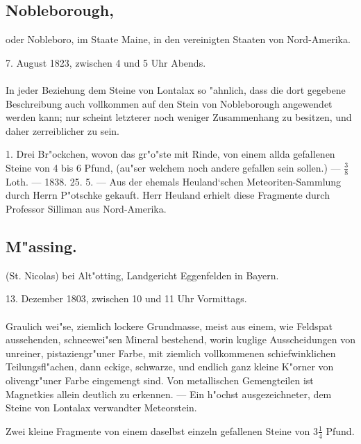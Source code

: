 \documentclass[a4paper, 11pt, oneside, polutonikogreek, german]{article}
\begin{document}
\subsection[Nobleborough.]{Nobleborough,}
\begin{center}
\small
oder Nobleboro, im Staate Maine, in den vereinigten Staaten von Nord-Amerika.

7. August 1823, zwischen 4 und 5 Uhr Abends.
\end{center}
\paragraph{}
In jeder Beziehung dem Steine von Lontalax so "ahnlich, dass die dort gegebene Beschreibung auch vollkommen auf den Stein von Nobleborough angewendet werden kann; nur scheint letzterer noch weniger Zusammenhang zu besitzen, und daher zerreiblicher zu sein.

1. Drei Br"ockchen, wovon das gr"o"ste mit Rinde, von einem allda gefallenen Steine von 4 bis 6 Pfund, (au"ser welchem noch andere gefallen sein sollen.) --- $\frac{3}{8}$ Loth. --- 1838. 25. 5. --- Aus der ehemals Heuland‘schen Meteoriten-Sammlung durch Herrn P"otschke gekauft. Herr Heuland erhielt diese Fragmente durch Professor Silliman aus Nord-Amerika.
\subsection{M"assing.}
\begin{center}
\small
(St. Nicolas) bei Alt"otting, Landgericht Eggenfelden in Bayern.

13. Dezember 1803, zwischen 10 und 11 Uhr Vormittags.
\end{center}
\paragraph{}
Graulich wei"se, ziemlich lockere Grundmasse, meist aus einem, wie Feldspat aussehenden, schneewei"sen Mineral bestehend‚ worin kuglige Ausscheidungen von unreiner, pistaziengr"uner Farbe, mit ziemlich vollkommenen schiefwinklichen Teilungsfl"achen, dann eckige, schwarze, und endlich ganz kleine K"orner von olivengr"uner Farbe eingemengt sind. Von metallischen Gemengteilen ist Magnetkies allein deutlich zu erkennen. --- Ein h"ochst ausgezeichneter, dem Steine von Lontalax verwandter Meteorstein.

Zwei kleine Fragmente von einem daselbst einzeln gefallenen Steine von $3\frac{1}{4}$ Pfund.
\end{document}
